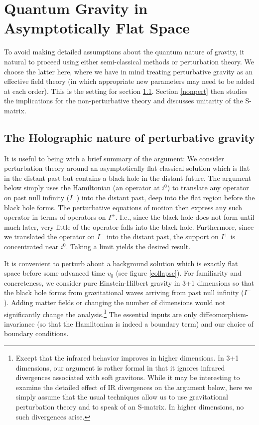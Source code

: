 \documentclass[12pt,onecolumn,eqsecnum,aps,prd,nofootinbib]{revtex4}
\begin{document}
\section{Quantum Gravity in Asymptotically Flat Space}
\label{AsFlat}

To avoid making detailed assumptions about the quantum nature of
gravity,  it natural to proceed using either semi-classical methods
or perturbation theory. We choose the latter here, where we have in
mind treating perturbative gravity as an effective field theory (in
which appropriate new parameters may need to be added at each
order). This is the setting for section \ref{pert}.  Section
\ref{nonpert} then studies the implications for the
non-perturbative theory and discusses unitarity of the S-matrix.


\subsection{The Holographic nature of perturbative gravity}
\label{pert}

It is useful to being with a brief summary of the argument:  We
consider perturbation theory around an asymptotically flat classical
solution which is flat in the distant past but contains a black hole
in the distant future.  The argument below simply uses  the Hamiltonian (an operator at $i^0$) to translate any operator on past null infinity ($I^-$) into the distant past, deep into the flat region before the black hole forms.   The perturbative equations of motion then express any such operator in terms of operators on $I^+$. I.e., since the black hole does not form until much later, very little of the operator falls into the black hole.  Furthermore, since we translated the operator on $I^-$ into the distant past, the support on $I^+$ is concentrated near $i^0$.  Taking a limit yields the desired result.

It is convenient to perturb about a background solution which is exactly flat
space before some advanced time $v_0$ (see figure \ref{collapse}).  For familiarity and concreteness, we consider pure Einstein-Hilbert
gravity in 3+1 dimensions so that the black hole forms from
gravitational waves arriving from past null infinity ($I^-$).
 Adding matter fields or changing the number of dimensions would not
significantly change the analysis.\footnote{Except that the infrared behavior improves in higher dimensions.  In 3+1 dimensions, our
argument is rather formal in that it ignores infrared divergences
associated with soft gravitons. While it may be interesting to
examine the detailed effect of IR divergences on the argument below,
here we simply assume that the usual techniques \cite{Weinberg}
allow us to use gravitational perturbation theory and to speak of an
S-matrix.  In higher dimensions, no such divergences arise.} The
essential inputs are only diffeomorphism-invariance (so that the Hamiltonian is indeed a boundary term) and our choice
of boundary conditions.
\end{document}
